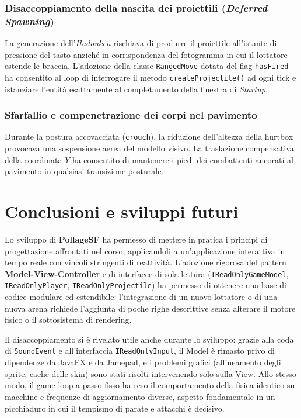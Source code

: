\documentclass[11pt, a4paper]{article}
\begin{document}
	\subsubsection{Disaccoppiamento della nascita dei proiettili (\emph{Deferred Spawning})}
	La generazione dell'\emph{Hadouken} rischiava di produrre il proiettile all'istante di pressione del tasto anziché in corrispondenza del fotogramma in cui il lottatore estende le braccia. L'adozione della classe \texttt{RangedMove} dotata del flag \texttt{hasFired} ha consentito al loop di interrogare il metodo \texttt{createProjectile()} ad ogni tick e istanziare l'entità esattamente al completamento della finestra di \emph{Startup}.
	
	\subsubsection{Sfarfallio e compenetrazione dei corpi nel pavimento}
	Durante la postura accovacciata (\texttt{crouch}), la riduzione dell'altezza della hurtbox provocava una sospensione aerea del modello visivo. La traslazione compensativa della coordinata $Y$ ha consentito di mantenere i piedi dei combattenti ancorati al pavimento in qualsiasi transizione posturale.
	
	\newpage
	
	\section{Conclusioni e sviluppi futuri}
	Lo sviluppo di \textbf{PollageSF} ha permesso di mettere in pratica i principi di progettazione affrontati nel corso, applicandoli a un'applicazione interattiva in tempo reale con vincoli stringenti di reattività. L'adozione rigorosa del pattern \textbf{Model-View-Controller} e di interfacce di sola lettura (\texttt{IReadOnlyGameModel}, \texttt{IReadOnlyPlayer}, \texttt{IReadOnlyProjectile}) ha permesso di ottenere una base di codice modulare ed estendibile: l'integrazione di un nuovo lottatore o di una nuova arena richiede l'aggiunta di poche righe descrittive senza alterare il motore fisico o il sottosistema di rendering.
	
	Il disaccoppiamento si è rivelato utile anche durante lo sviluppo: grazie alla coda di \texttt{SoundEvent} e all'interfaccia \texttt{IReadOnlyInput}, il Model è rimasto privo di dipendenze da JavaFX e da Jamepad, e i problemi grafici (allineamento degli sprite, cache delle skin) sono stati risolti intervenendo solo sulla View. Allo stesso modo, il game loop a passo fisso ha reso il comportamento della fisica identico su macchine e frequenze di aggiornamento diverse, aspetto fondamentale in un picchiaduro in cui il tempismo di parate e attacchi è decisivo.
	
\end{document}
